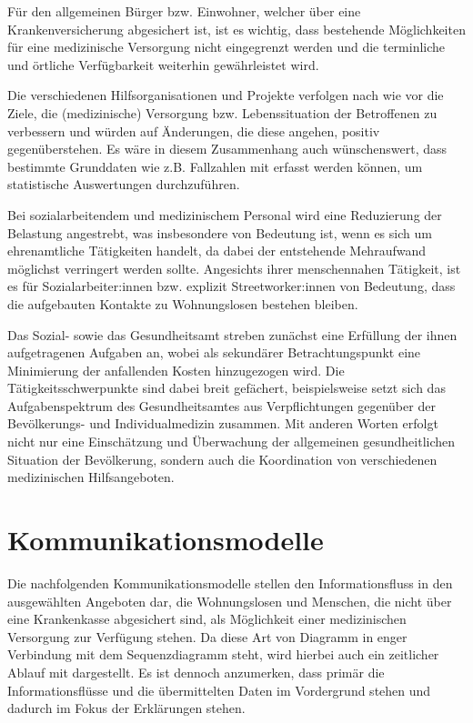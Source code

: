Für den allgemeinen Bürger bzw. Einwohner, welcher über eine Krankenversicherung abgesichert ist, ist es wichtig, dass bestehende Möglichkeiten für eine medizinische Versorgung nicht eingegrenzt werden und die terminliche und örtliche Verfügbarkeit weiterhin gewährleistet wird.

Die verschiedenen Hilfsorganisationen und Projekte verfolgen nach wie vor die Ziele, die (medizinische) Versorgung bzw. Lebenssituation der Betroffenen zu verbessern und würden auf Änderungen, die diese angehen, positiv gegenüberstehen. Es wäre in diesem Zusammenhang auch wünschenswert, dass bestimmte Grunddaten wie z.B. Fallzahlen mit erfasst werden können, um statistische Auswertungen durchzuführen.

Bei sozialarbeitendem und medizinischem Personal wird eine Reduzierung der Belastung angestrebt, was insbesondere von Bedeutung ist, wenn es sich um ehrenamtliche Tätigkeiten handelt, da dabei der entstehende Mehraufwand möglichst verringert werden sollte. Angesichts ihrer menschennahen Tätigkeit, ist es für Sozialarbeiter:innen bzw. explizit Streetworker:innen von Bedeutung, dass die aufgebauten Kontakte zu Wohnungslosen bestehen bleiben.

Das Sozial- sowie das Gesundheitsamt streben zunächst eine Erfüllung der ihnen aufgetragenen Aufgaben an, wobei als sekundärer Betrachtungspunkt eine Minimierung der anfallenden Kosten hinzugezogen wird. Die Tätigkeitsschwerpunkte sind dabei breit gefächert, beispielsweise setzt sich das Aufgabenspektrum des Gesundheitsamtes aus Verpflichtungen gegenüber der Bevölkerungs- und Individualmedizin zusammen. Mit anderen Worten erfolgt nicht nur eine Einschätzung und Überwachung der allgemeinen gesundheitlichen Situation der Bevölkerung, sondern auch die Koordination von verschiedenen medizinischen Hilfsangeboten.


\section{Kommunikationsmodelle}\label{sec:com}

Die nachfolgenden Kommunikationsmodelle stellen den Informationsfluss in den ausgewählten Angeboten dar, die Wohnungslosen und Menschen, die nicht über eine Krankenkasse abgesichert sind, als Möglichkeit einer medizinischen Versorgung zur Verfügung stehen. Da diese Art von Diagramm in enger Verbindung mit dem Sequenzdiagramm steht, wird hierbei auch ein zeitlicher Ablauf mit dargestellt. Es ist dennoch anzumerken, dass primär die Informationsflüsse und die übermittelten Daten im Vordergrund stehen und dadurch im Fokus der Erklärungen stehen.

